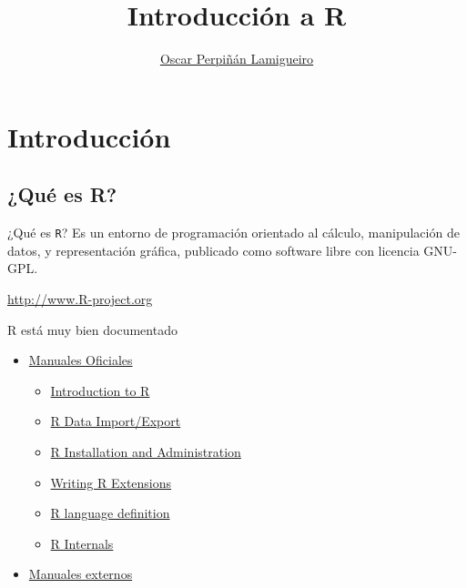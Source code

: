 \documentclass[aspectratio=169, usenames,svgnames,dvipsnames]{beamer}
\author{\href{https://oscarperpinan.github.io}{Oscar Perpiñán Lamigueiro}}
\date{}
\title{Introducción a R}
\institute[UPM]{Universidad Politécnica de Madrid}
\begin{document}
\maketitle

\section{Introducción}
\label{sec:org6c616e2}

\subsection{¿Qué es R?}
\label{sec:org9386a7b}
\begin{frame}[label={sec:orgdc7bc6f},fragile]{¿Qué es \texttt{R}?}
 Es un entorno de programación orientado al cálculo, manipulación de datos, y representación gráfica, publicado como software libre con licencia GNU-GPL.
\begin{center}
\url{http://www.R-project.org} 
\end{center}
\end{frame}

\begin{frame}[label={sec:orgc2d048c}]{R está muy bien documentado}
\begin{itemize}
\item \href{http://cran.r-project.org/manuals.html}{Manuales Oficiales}

\begin{itemize}
\item \href{http://cran.r-project.org/doc/manuals/r-release/R-intro.html}{Introduction to R}

\item \href{http://cran.r-project.org/doc/manuals/r-release/R-data.html}{R Data Import/Export}

\item \href{http://cran.r-project.org/doc/manuals/r-release/R-admin.html}{R Installation and Administration}

\item \href{http://cran.r-project.org/doc/manuals/r-release/R-exts.html}{Writing R Extensions}

\item \href{http://cran.r-project.org/doc/manuals/r-release/R-lang.html}{R language definition}

\item \href{http://cran.r-project.org/doc/manuals/r-release/R-ints.html}{R Internals}
\end{itemize}

\item \href{http://cran.r-project.org/other-docs.html}{Manuales externos}
\end{itemize}
\end{frame}
\end{document}
